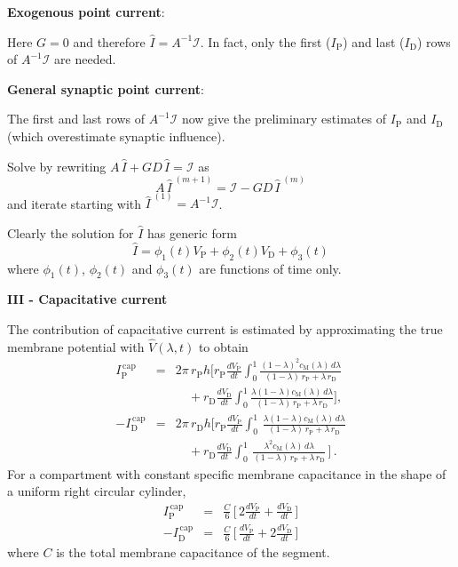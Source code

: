 \documentclass{slides}
\def\ds{\displaystyle}
\begin{document}
%
%
\begin{slide}
\textbf{Exogenous point current}:

Here $G=0$ and therefore $\widehat{I}=A^{-1}\mathcal{I}$.
In fact, only the first ($I_\mathrm{P}$) and last ($I_\mathrm{D}$)
rows of $A^{-1}\mathcal{I}$ are needed.

\textbf{General synaptic point current}:

The first and last rows of $A^{-1}\mathcal{I}$ now give the
preliminary estimates of $I_\mathrm{P}$ and $I_\mathrm{D}$ (which
overestimate synaptic influence).

Solve by rewriting $A\,\widehat{I}+GD\,\widehat{I}=\mathcal{I}$ as
\[
A\,\widehat{I}^{\;(m+1)}=\mathcal{I}-GD\,\widehat{I}^{\;(m)}
\]
and iterate starting with $\widehat{I}^{\;(1)}=A^{-1}\mathcal{I}$.

Clearly the solution for $\widehat{I}$ has generic form
\[
\widehat{I} = \phi_1(t)V_\mathrm{P} + \phi_2(t)V_\mathrm{D}+\phi_3(t)
\]
where $\phi_1(t)$, $\phi_2(t)$ and $\phi_3(t)$ are functions of
time only.
\end{slide}

%
%
\begin{slide}
\begin{center}
\textbf{III - Capacitative current}
\end{center}
The contribution of capacitative current is estimated by
approximating the true membrane potential with
$\widehat{V}(\lambda,t)$ to obtain
\[
\begin{array}{rcl}
I^\mathrm{\,cap}_\mathrm{P} & = & 2\pi\, r_\mathrm{P} h
\ds\Bigg[r_\mathrm{P}\frac{dV_\mathrm{P}}{dt}
\int_0^1\frac{(1-\lambda)^2 c_\mathrm{M}(\lambda)\,d\lambda}
{(1-\lambda)\,r_\mathrm{P}+\lambda\,r_\mathrm{D}}\\[25pt]
&&\ds\quad+r_\mathrm{D}\frac{dV_\mathrm{D}}{dt}
\int_0^1 \frac{\lambda(1-\lambda)c_\mathrm{M}(\lambda)\,d\lambda}
{(1-\lambda)\,r_\mathrm{P}+\lambda\,r_\mathrm{D}}\Bigg],\\[25pt]
-I^\mathrm{\,cap}_\mathrm{D} & = & 2\pi\, r_\mathrm{D} h
\ds\Bigg[r_\mathrm{P}\frac{dV_\mathrm{P}}{dt}\int_0^1\,
\frac{\lambda(1-\lambda)c_\mathrm{M}(\lambda)\,d\lambda}
{(1-\lambda)\,r_\mathrm{P}+\lambda\,r_\mathrm{D}}\\[25pt]
&&\quad\ds+r_\mathrm{D}\frac{dV_\mathrm{D}}{dt}\int_0^1\,\frac{\lambda^2
c_\mathrm{M}(\lambda)\,d\lambda}
{(1-\lambda)\,r_\mathrm{P}+\lambda\,r_\mathrm{D}}\,\Bigg]\,.
\end{array}
\]
For a compartment with constant specific membrane capacitance in the
shape of a uniform right circular cylinder,
\[
\begin{array}{rcl}
I^\mathrm{\,cap}_\mathrm{P} & = & \ds\frac{C}{6}\,
\Bigg[\,2\frac{dV_\mathrm{P}}{dt}+\frac{dV_\mathrm{D}}{dt}\,\Bigg]\\[25pt]
-I^\mathrm{\,cap}_\mathrm{D} & = & \ds\frac{C}{6}\,
\Bigg[\,\frac{dV_\mathrm{P}}{dt}+2\frac{dV_\mathrm{D}}{dt} \,\Bigg]
\end{array}
\]
where $C$ is the total membrane capacitance of the segment.
\end{slide}
\end{document}
